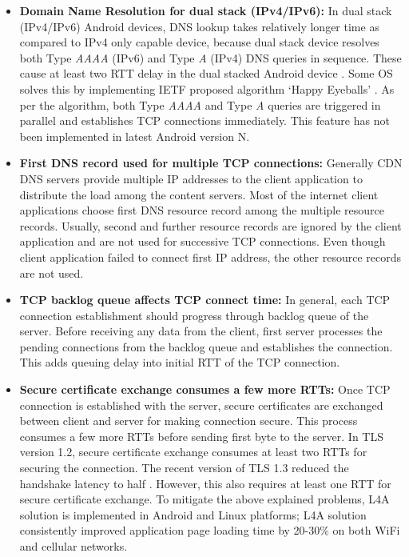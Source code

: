 \begin{multicols}{2}
\begin{itemize}
\item {\bf Domain Name Resolution for dual stack (IPv4/IPv6):} In dual stack (IPv4/IPv6) Android devices, DNS lookup takes relatively longer time as compared to IPv4 only capable device, because dual stack device resolves both Type \textit{AAAA} (IPv6) and Type \textit{A} (IPv4) DNS queries in sequence. These cause at least two RTT delay in the dual stacked Android device \cite{art1-key15}. Some OS solves this by implementing IETF proposed algorithm `Happy Eyeballs’ \cite{art1-key16}. As per the algorithm, both Type \textit{AAAA} and Type \textit{A} queries are triggered in parallel and establishes TCP connections immediately. This feature has not been implemented in latest Android version N.
\item{\bf First DNS record used for multiple TCP connections:} Generally CDN DNS servers provide multiple IP addresses to the client application to distribute the load among the content servers. Most of the internet client applications choose first DNS resource record among the multiple resource records. Usually, second and further resource records are ignored by the client application and are not used for successive TCP connections. Even though client application failed to connect first IP address, the other resource records are not used.
\item{\bf TCP backlog queue affects TCP connect time:} In general, each TCP connection establishment should progress through backlog queue of the server. Before receiving any data from the client, first server processes the pending connections from the backlog queue and establishes the connection. This adds queuing delay into initial RTT of the TCP connection.
\item{\bf Secure certificate exchange consumes a few more RTTs:} Once TCP connection is established with the server, secure certificates are exchanged between client and server for making connection secure. This process consumes a few more RTTs before sending first byte to the server. In TLS version 1.2, secure certificate exchange consumes at least two RTTs for securing the connection. The recent version of TLS 1.3 reduced the handshake latency to half \cite{art1-key17}. However, this also requires at least one RTT for secure certificate exchange. To mitigate the above explained problems, L4A solution is implemented in Android and Linux platforms; L4A solution consistently improved application page loading time by 20-30$\%$ on both WiFi and cellular networks.
\end{itemize}


\end{multicols}
